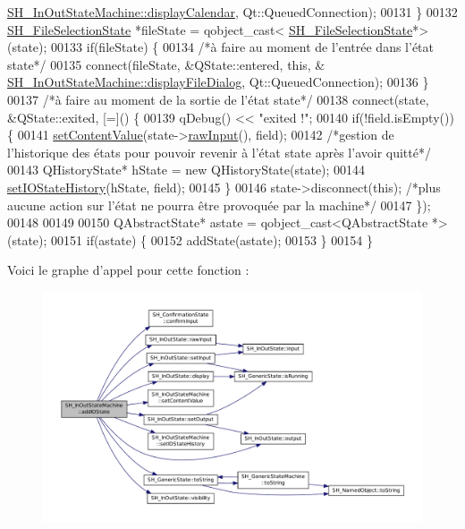 \begin{DoxyCode}
      \hyperlink{classSH__InOutStateMachine_ab3a12d1f9b658d8ffdc17669a6c065f2}{SH\_InOutStateMachine::displayCalendar}, Qt::QueuedConnection);
00131     \}
00132     \hyperlink{classSH__FileSelectionState}{SH\_FileSelectionState} *fileState = qobject\_cast<
      \hyperlink{classSH__FileSelectionState}{SH\_FileSelectionState}*>(state);
00133     \textcolor{keywordflow}{if}(fileState) \{
00134         \textcolor{comment}{/*à faire au moment de l'entrée dans l'état state*/}
00135         connect(fileState, &QState::entered, \textcolor{keyword}{this}, &
      \hyperlink{classSH__InOutStateMachine_abd206c3bc32bb7690df9c3e1cd546ebc}{SH\_InOutStateMachine::displayFileDialog}, Qt::QueuedConnection);
00136     \}
00137     \textcolor{comment}{/*à faire au moment de la sortie de l'état state*/}
00138     connect(state, &QState::exited, [=]() \{
00139         qDebug() << \textcolor{stringliteral}{"exited !"};
00140         \textcolor{keywordflow}{if}(!field.isEmpty()) \{
00141             \hyperlink{classSH__InOutStateMachine_a9ab1534306b2bdb62743d4bcefe40c17}{setContentValue}(state->\hyperlink{classSH__InOutState_a4c674a54f41d2e6ef951b22393dcd89f}{rawInput}(), field);
00142             \textcolor{comment}{/*gestion de l'historique des états pour pouvoir revenir à l'état state après l'avoir quitté*/}
00143             QHistoryState* hState = \textcolor{keyword}{new} QHistoryState(state);
00144             \hyperlink{classSH__InOutStateMachine_acbcce2c4300af1634d928b30e5e9be1c}{setIOStateHistory}(hState, field);
00145         \}
00146         state->disconnect(\textcolor{keyword}{this}); \textcolor{comment}{/*plus aucune action sur l'état ne pourra être provoquée par la machine*/}
00147     \});
00148 
00149 
00150     QAbstractState* astate = qobject\_cast<QAbstractState *>(state);
00151     \textcolor{keywordflow}{if}(astate) \{
00152         addState(astate);
00153     \}
00154 \}
\end{DoxyCode}


Voici le graphe d'appel pour cette fonction \-:\nopagebreak
\begin{figure}[H]
\begin{center}
\leavevmode
\includegraphics[width=350pt]{classSH__InOutStateMachine_a2528cffddbe6f98c32ebef41423c0118_cgraph}
\end{center}
\end{figure}





